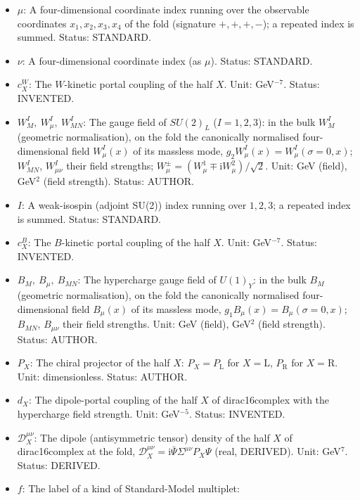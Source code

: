 \documentclass[
  10pt,
]{article}
\begin{document}
\begin{itemize}
\item
  \(\mu\): A four-dimensional coordinate index running over the
  observable coordinates \(x_1, x_2, x_3, x_4\) of the fold (signature
  \(+,+,+,-\)); a repeated index is summed. Status: STANDARD.
\item
  \(\nu\): A four-dimensional coordinate index (as \(\mu\)). Status:
  STANDARD.
\item
  \(c^{W}_X\): The \(W\)-kinetic portal coupling of the half \(X\).
  Unit: GeV\(^{-7}\). Status: INVENTED.
\item
  \(W^I_M,\ W^I_\mu,\ W^I_{MN}\): The gauge field of \(SU(2)_L\)
  (\(I = 1, 2, 3\)): in the bulk \(W^I_M\) (geometric normalisation), on
  the fold the canonically normalised four-dimensional field
  \(W^I_\mu(x)\) of its massless mode,
  \(g_2W^I_\mu(x) = W^I_\mu(\sigma = 0, x)\); \(W^I_{MN}\),
  \(W^I_{\mu\nu}\) their field strengths;
  \(W^\pm_\mu = (W^1_\mu \mp \mathrm{i}W^2_\mu)/\sqrt2\). Unit: GeV
  (field), GeV\(^2\) (field strength). Status: AUTHOR.
\item
  \(I\): A weak-isospin (adjoint SU(2)) index running over \(1, 2, 3\);
  a repeated index is summed. Status: STANDARD.
\item
  \(c^{B}_X\): The \(B\)-kinetic portal coupling of the half \(X\).
  Unit: GeV\(^{-7}\). Status: INVENTED.
\item
  \(B_M,\ B_\mu,\ B_{MN}\): The hypercharge gauge field of \(U(1)_Y\):
  in the bulk \(B_M\) (geometric normalisation), on the fold the
  canonically normalised four-dimensional field \(B_\mu(x)\) of its
  massless mode, \(g_1B_\mu(x) = B_\mu(\sigma = 0, x)\); \(B_{MN}\),
  \(B_{\mu\nu}\) their field strengths. Unit: GeV (field), GeV\(^2\)
  (field strength). Status: AUTHOR.
\item
  \(P_X\): The chiral projector of the half \(X\):
  \(P_X = P_{\mathrm{L}}\) for \(X = \mathrm{L}\), \(P_{\mathrm{R}}\)
  for \(X = \mathrm{R}\). Unit: dimensionless. Status: AUTHOR.
\item
  \(d_X\): The dipole-portal coupling of the half \(X\) of
  dirac16complex with the hypercharge field strength. Unit:
  GeV\(^{-5}\). Status: INVENTED.
\item
  \(\mathcal{D}_X^{\mu\nu}\): The dipole (antisymmetric tensor) density
  of the half \(X\) of dirac16complex at the fold,
  \(\mathcal{D}_X^{\mu\nu} = \mathrm{i}\bar\Psi\Sigma^{\mu\nu}P_X\Psi\)
  (real, DERIVED). Unit: GeV\(^7\). Status: DERIVED.
\item
  \(f\): The label of a kind of Standard-Model multiplet:

\end{itemize}
\end{document}
